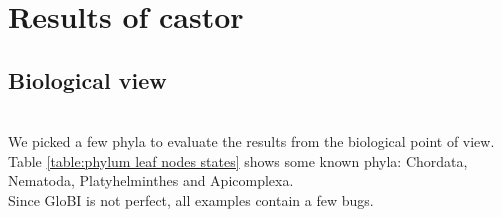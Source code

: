   \section{Results of castor}

    \subsection{Biological view}

       \\

      We picked a few phyla to evaluate the results from the biological point of view. \\
      Table \ref{table:phylum leaf nodes states} shows some known phyla: Chordata, Nematoda, 
        Platyhelminthes and Apicomplexa. \\
      Since GloBI is not perfect, all examples contain a few bugs.

      \todo{\ref{table:table:percentage loss information subtrees}} \\



